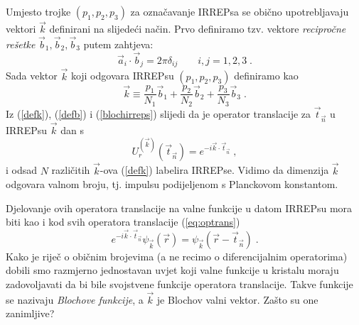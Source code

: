 Umjesto trojke $(p_1, p_2, p_3)$ za označavanje IRREPsa se obično
upotrebljavaju vektori $\vec{k}$ definirani na slijedeći način. Prvo
definiramo tzv. vektore \emph{recipročne rešetke} $\vec{b}_1, \vec{b}_2,
\vec{b}_3$ putem zahtjeva:
\begin{equation}
   \vec{a}_i\cdot \vec{b}_j = 2 \pi \delta_{ij} \qquad i,j = 1, 2, 3 \;.
\label{defb}
\end{equation}
Sada vektor $\vec{k}$ koji odgovara IRREPsu
$(p_1, p_2, p_3)$ definiramo kao
\begin{equation}
  \vec{k} \equiv \frac{p_1}{N_1}\vec{b}_1 + \frac{p_2}{N_2}\vec{b}_2 + 
  \frac{p_3}{N_3}\vec{b}_3 \;.
\label{defk}
\end{equation}
Iz (\ref{defk}), (\ref{defb}) i (\ref{blochirreps}) slijedi da je
operator translacije za $\vec{t}_{\vec{n}}$ u IRREPsu $\vec{k}$
dan s
\begin{equation}
 U_{r}^{(\vec{k})} (\vec{t}_{\vec{n}}) = 
 e^{-i \vec{k}\cdot \vec{t}_{\vec{n}}} \;,
\end{equation}
i odsad $N$ različitih $\vec{k}$-ova (\ref{defk}) labelira IRREPse.
Vidimo da dimenzija $\vec{k}$ odgovara valnom broju, tj. impulsu
podijeljenom s Planckovom konstantom.

Djelovanje ovih operatora translacije na valne funkcije u datom
IRREPsu mora biti kao i kod svih operatora translacije (\ref{eq:optrans})
\begin{equation}
 e^{-i \vec{k}\cdot \vec{t}_{\vec{n}}} \psi_{\vec{k}}(\vec{r}) =
\psi_{\vec{k}}(\vec{r} - \vec{t}_{\vec{n}}) \;.
\label{bloch}
\end{equation}
Kako je riječ o običnim brojevima (a ne recimo o diferencijalnim
operatorima) dobili smo razmjerno jednostavan uvjet koji valne funkcije
u kristalu moraju zadovoljavati da bi bile svojstvene funkcije operatora
translacije. Takve funkcije se nazivaju \emph{Blochove funkcije}, a
$\vec{k}$ je Blochov valni vektor.
Zašto su one zanimljive?

